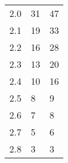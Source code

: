 \begin{table}[H]
{\begin{tabular}{|l|l|l|}
2.0                      & 31                                                                                                                   & 47                                                                                                                     \\
2.1                      & 19                                                                                                                   & 33                                                                                                                     \\
2.2                      & 16                                                                                                                   & 28                                                                                                                     \\
2.3                      & 13                                                                                                                   & 20                                                                                                                     \\
2.4                      & 10                                                                                                                   & 16                                                                                                                     \\
2.5                      & 8                                                                                                                    & 9                                                                                                                      \\
2.6                      & 7                                                                                                                    & 8                                                                                                                      \\
2.7                      & 5                                                                                                                    & 6                                                                                                                      \\
2.8                      & 3                                                                                                                    & 3                                                                                                                      \\

\end{tabular}}
\end{table}
